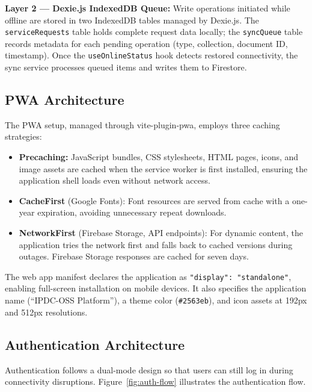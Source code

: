 \textbf{Layer 2 --- Dexie.js IndexedDB Queue:} Write operations initiated while offline are stored in two IndexedDB tables managed by Dexie.js. The \texttt{serviceRequests} table holds complete request data locally; the \texttt{syncQueue} table records metadata for each pending operation (type, collection, document ID, timestamp). Once the \texttt{useOnlineStatus} hook detects restored connectivity, the sync service processes queued items and writes them to Firestore.

\subsection{PWA Architecture}

The PWA setup, managed through vite-plugin-pwa, employs three caching strategies:

\begin{itemize}
\item \textbf{Precaching:} JavaScript bundles, CSS stylesheets, HTML pages, icons, and image assets are cached when the service worker is first installed, ensuring the application shell loads even without network access.
\item \textbf{CacheFirst} (Google Fonts): Font resources are served from cache with a one-year expiration, avoiding unnecessary repeat downloads.
\item \textbf{NetworkFirst} (Firebase Storage, API endpoints): For dynamic content, the application tries the network first and falls back to cached versions during outages. Firebase Storage responses are cached for seven days.
\end{itemize}

The web app manifest declares the application as \texttt{"display": "standalone"}, enabling full-screen installation on mobile devices. It also specifies the application name (``IPDC-OSS Platform''), a theme color (\texttt{\#2563eb}), and icon assets at 192px and 512px resolutions.

\subsection{Authentication Architecture}

Authentication follows a dual-mode design so that users can still log in during connectivity disruptions. Figure~\ref{fig:auth-flow} illustrates the authentication flow.

